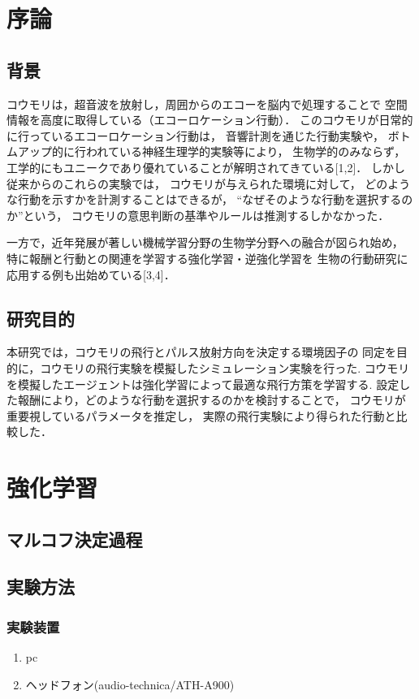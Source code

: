 \documentclass{jsreport}
\begin{document}
\tableofcontents

\newpage
\chapter{序論}
\section{背景}
コウモリは，超音波を放射し，周囲からのエコーを脳内で処理することで
空間情報を高度に取得している（エコーロケーション行動）．
このコウモリが日常的に行っているエコーロケーション行動は，
音響計測を通じた行動実験や，
ボトムアップ的に行われている神経生理学的実験等により，
生物学的のみならず，
工学的にもユニークであり優れていることが解明されてきている[1,2]．
しかし従来からのこれらの実験では，
コウモリが与えられた環境に対して，
どのような行動を示すかを計測することはできるが，
“なぜそのような行動を選択するのか”という，
コウモリの意思判断の基準やルールは推測するしかなかった．

一方で，近年発展が著しい機械学習分野の生物学分野への融合が図られ始め，
特に報酬と行動との関連を学習する強化学習・逆強化学習を
生物の行動研究に応用する例も出始めている[3,4]．

\section{研究目的}
本研究では，コウモリの飛行とパルス放射方向を決定する環境因子の
同定を目的に，コウモリの飛行実験を模擬したシミュレーション実験を行った.
コウモリを模擬したエージェントは強化学習によって最適な飛行方策を学習する.
設定した報酬により，どのような行動を選択するのかを検討することで，
コウモリが重要視しているパラメータを推定し，
実際の飛行実験により得られた行動と比較した．


\newpage
\chapter{強化学習}
\section{マルコフ決定過程}

\section{実験方法}
  \subsection{実験装置}
  \begin{enumerate}
    \item pc
    \item ヘッドフォン(audio-technica/ATH-A900)
  \end{enumerate}
\end{document}
